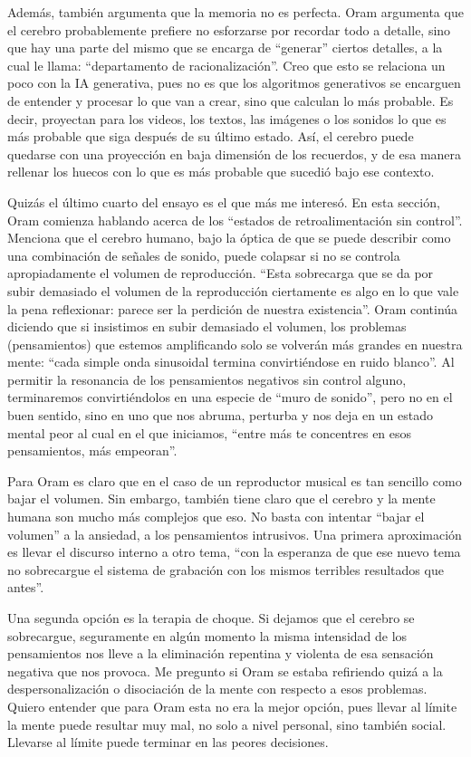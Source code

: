 Además, también argumenta que la memoria no es perfecta. Oram argumenta que el cerebro probablemente prefiere no esforzarse
por recordar todo a detalle, sino que hay una parte del mismo que se encarga de ``generar'' ciertos detalles, a la cual
le llama: ``departamento de racionalización''. Creo que esto se relaciona un poco con la IA generativa, pues no es que
los algoritmos generativos se encarguen de entender y procesar lo que van a crear, sino que calculan lo más probable. 
Es decir, proyectan para los videos, los textos, las imágenes o los sonidos lo que es más probable que siga después de 
su último estado. Así, el cerebro puede quedarse con una proyección en baja dimensión de los recuerdos, y de esa manera
rellenar los huecos con lo que es más probable que sucedió bajo ese contexto. 

Quizás el último cuarto del ensayo es el que más me interesó. En esta sección, Oram comienza hablando acerca de los 
``estados de retroalimentación sin control''. Menciona que el cerebro humano, bajo la óptica de que se puede describir como
una combinación de señales de sonido, puede colapsar si no se controla apropiadamente el volumen de reproducción. ``Esta sobrecarga
que se da por subir demasiado el volumen de la reproducción ciertamente es algo en lo que vale la pena reflexionar: parece ser la 
perdición de nuestra existencia''. Oram continúa diciendo que si insistimos en subir demasiado el volumen, los problemas (pensamientos)
que estemos amplificando solo se volverán más grandes en nuestra mente: ``cada simple onda sinusoidal termina convirtiéndose en ruido
blanco''. Al permitir la resonancia de los pensamientos negativos sin control alguno, terminaremos convirtiéndolos en una especie de ``muro
de sonido'', pero no en el buen sentido, sino en uno que nos abruma, perturba y nos deja en un estado mental peor al cual en
el que iniciamos, ``entre más te concentres en esos pensamientos, más empeoran''.

Para Oram es claro que en el caso de un reproductor musical es tan sencillo como bajar el volumen. Sin embargo, también tiene claro
que el cerebro y la mente humana son mucho más complejos que eso. No basta con intentar ``bajar el volumen'' a la ansiedad, a los pensamientos
intrusivos. Una primera aproximación es llevar el discurso interno a otro tema, ``con la esperanza de que ese nuevo tema no sobrecargue 
el sistema de grabación con los mismos terribles resultados que antes''. 

Una segunda opción es la terapia de choque. Si dejamos que el cerebro se sobrecargue, seguramente en algún momento la misma intensidad
de los pensamientos nos lleve a la eliminación repentina y violenta de esa sensación negativa que nos provoca. Me pregunto si Oram
se estaba refiriendo quizá a la despersonalización o disociación de la mente con respecto a esos problemas. Quiero entender que para 
Oram esta no era la mejor opción, pues llevar al límite la mente puede resultar muy mal, no solo a nivel personal, sino también social. 
Llevarse al límite puede terminar en las peores decisiones. 

